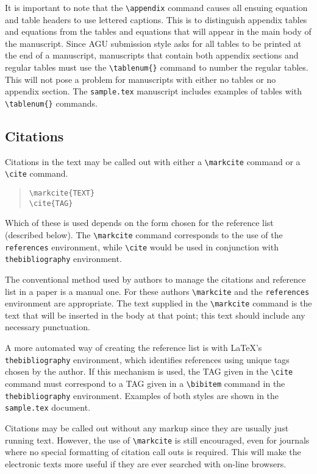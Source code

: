 It is important to note that the \verb"\appendix" command causes all 
ensuing equation and table headers to use lettered captions.  This is 
to distinguish appendix tables and equations from the tables and equations 
that will appear in the main body of the manuscript.  Since AGU submission 
style asks for all tables to be printed at the end of a manuscript, 
manuscripts that contain both appendix sections and regular tables must 
use the \verb"\tablenum{}" command to number the regular tables.  This will 
not pose a problem for manuscripts with either no tables or no appendix 
section.  The \verb"sample.tex" manuscript includes examples of tables 
with \verb"\tablenum{}" commands.

\subsection{Citations}

Citations in the text may be called out with either a 
\verb"\markcite" command or a \verb"\cite" command.
\begin{quote}
\verb"\markcite{TEXT}"\\[.5ex]
\verb"\cite{TAG}"
\end{quote}
Which of these is used depends on the form chosen for the reference 
list (described below).  The \verb"\markcite" command corresponds to 
the use of the {\tt references} environment, while \verb"\cite" would 
be used in conjunction with {\tt thebibliography} environment.

The conventional method used by authors to manage the citations 
and reference list in a paper is a manual one.  For these authors 
\verb"\markcite" and the {\tt references} environment are appropriate.
The text supplied in the \verb"\markcite" command is the text that
will be inserted in the body at that point; this text should include
any necessary punctuation.

A more automated way of creating the reference list is with \LaTeX's {\tt 
thebibliography} environment, which identifies references using unique tags 
chosen by the author.  If this mechanism is used, the {\small TAG} given in 
the \verb"\cite" command must correspond to a {\small TAG} given in a 
\verb"\bibitem" command in the {\tt thebibliography} environment.  Examples 
of both styles are shown in the {\tt sample.tex} document.

Citations may be called out without any markup since they are usually 
just running text.  However, the use of \verb"\markcite" is still 
encouraged, even for journals where no special formatting of citation 
call outs is required.  This will make the electronic texts more useful 
if they are ever searched with on-line browsers.

